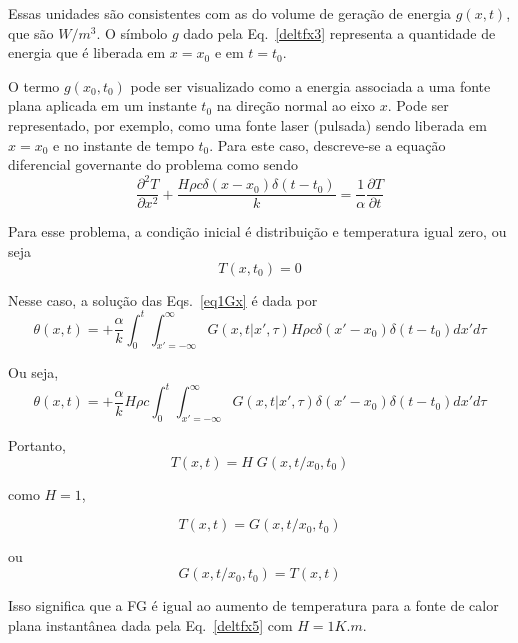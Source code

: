 Essas unidades são consistentes com as do volume de geração de energia $g(x,t)$, que são $W/m^3$. O símbolo $g$ dado pela Eq.~\ref{deltfx3} representa a quantidade de energia que é liberada em $x=x_0$ e em $t = t_0$.

O termo $g(x_0,t_0)$ pode ser visualizado como a energia associada a uma fonte plana aplicada em um instante $t_0$ na direção normal ao eixo $x
$. Pode ser representado, por exemplo, como uma fonte laser (pulsada) sendo liberada em $x = x_0$ e no instante de tempo $t_0$. Para este caso, descreve-se a equação diferencial governante do problema como sendo
\begin{equation}\label{eq1Gx}
    \frac{\partial ^2 T}{\partial x^2} + \frac{H \rho c \delta(x-x_0) \delta(t-t_0)}{k}
    = \frac{1}{\alpha} \frac{\partial T}{\partial t}  
\end{equation}

Para esse problema, a condição inicial é distribuição e temperatura igual  zero, ou seja
\begin{equation}\label{eqinit}
    T(x,t_0) = 0
\end{equation}

Nesse caso, a solução das Eqs.~\ref{eq1Gx} é dada por 
\begin{equation}\label{eq:solg1}
    \theta(x,t) =  + \frac{\alpha}{k}\int_{0}^{t} 
    \int_{x'=-\infty}^{\infty}G(x,t|x',\tau)H \rho c \delta(x'-x_0) \delta(t-t_0) dx'd\tau
\end{equation}

Ou seja,
\begin{equation}\label{eq:solg2}
    \theta(x,t) =  + \frac{\alpha}{k}H \rho c 
    \int_{0}^{t}\int_{x'=-\infty}^{\infty}G(x,t|x',\tau) \delta(x'-x_0) \delta(t-t_0) dx'd\tau
\end{equation}

Portanto,	
\begin{equation}\label{deltfx30}
    T(x,t) = H\;G(x,t/x_0,t_0) 
\end{equation}

como $H=1$,
	
\begin{equation}\label{deltfx4}
    T(x,t) = G(x,t/x_0,t_0)  
\end{equation}
	
ou
\begin{equation}\label{deltfx5}
    G(x,t/x_0,t_0) = T(x,t)
\end{equation}
	
Isso significa que a FG é igual ao aumento de temperatura para a fonte de calor plana instantânea dada pela Eq.~\ref{deltfx5} com $H = 1 K.m$.
	
